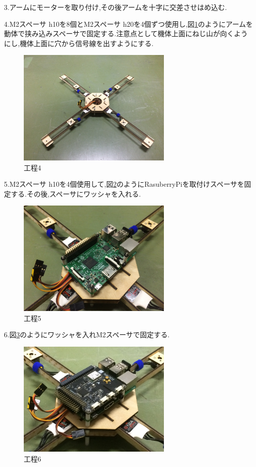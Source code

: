 \documentclass[12pt,oneside]{sotsuken_paper}
\begin{document}
3.アームにモーターを取り付け,その後アームを十字に交差させはめ込む.


4.M2スペーサ h10を8個とM2スペーサ h20を4個ずつ使用し,図\ref{fig:kitai2}のようにアームを動体で挟み込みスペーサで固定する.注意点として機体上面にねじ山が向くようにし,機体上面に穴から信号線を出すようにする.

\begin{figure}[htbp]
	\begin{center}
		\includegraphics[width=75mm]{image/kitai/kitai2.jpg}
		\caption{工程4}
		\label{fig:kitai2}
	\end{center}
\end{figure}


5.M2スペーサ h10を4個使用して,図\ref{fig:kitai3}のようにRasuberryPiを取付けスペーサを固定する.その後,スペーサにワッシャを入れる.

\begin{figure}[htbp]
	\begin{center}
		\includegraphics[width=75mm]{image/kitai/kitai3.jpg}
		\caption{工程5}
		\label{fig:kitai3}
	\end{center}
\end{figure}


6.図\ref{fig:kitai4}のようにワッシャを入れM2スペーサで固定する.

\begin{figure}[htbp]
	\begin{center}
		\includegraphics[width=75mm]{image/kitai/kitai4.jpg}
		\caption{工程6}
		\label{fig:kitai4}
	\end{center}
\end{figure}
\end{document}
